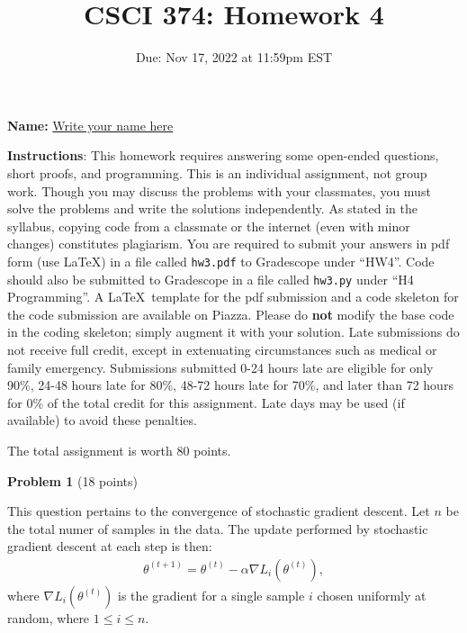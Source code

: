\documentclass[letterpaper, 11pt]{article}
\title{CSCI 374: Homework 4}
\author{}
\date{Due: Nov 17, 2022 at 11:59pm EST}
\begin{document}
\maketitle

\setlength{\parindent}{0em}
\setlength{\parskip}{0.8em}

\textbf{Name:} \underline{\hspace{30pt} \color{blue} Write your name here \hspace{30pt}}
\vspace{1em}

	\textbf{Instructions}: This homework requires answering some open-ended questions, short proofs, and
	programming. This is an individual assignment, not group work. Though you may
	discuss the problems with your classmates, you must solve the problems and
	write the solutions independently. As stated in the syllabus, copying code
	from a classmate or the internet (even with minor changes) constitutes
	plagiarism. You are required to submit your answers in pdf form (use \LaTeX)
	in a file called \texttt{hw3.pdf} to Gradescope under ``HW4''. Code should also be submitted to Gradescope in a file called \texttt{hw3.py} under ``H4 Programming''. A \LaTeX\  template for the pdf submission and a code skeleton for the code submission are available on Piazza. Please do \textbf{not} modify the base code in the coding skeleton; simply augment it with your solution.
	Late submissions do not receive full credit, except in extenuating circumstances such
	as medical or family emergency. Submissions submitted 0-24 hours late are eligible for only 90\%, 24-48 hours late for 80\%, 48-72 hours late for 70\%, and later
	than 72 hours for 0\% of the total credit for this assignment. Late days may be used (if available) to avoid these penalties.
	
	The total assignment is worth 80 points.

\vspace{1em}

{\large\textbf{Problem 1}} (18 points)

This question pertains to the convergence of stochastic gradient descent. Let $n$ be the total numer of samples in the data. The update performed by stochastic gradient descent at each step is then:
%
\begin{align*}
	\theta^{(t+1)} = \theta^{(t)} - \alpha \nabla L_i(\theta^{(t)}),
\end{align*}
%
where $\nabla L_i(\theta^{(t)})$ is the gradient for a single sample $i$ chosen uniformly at random, where $1 \leq i \leq n$. 
\end{document}
